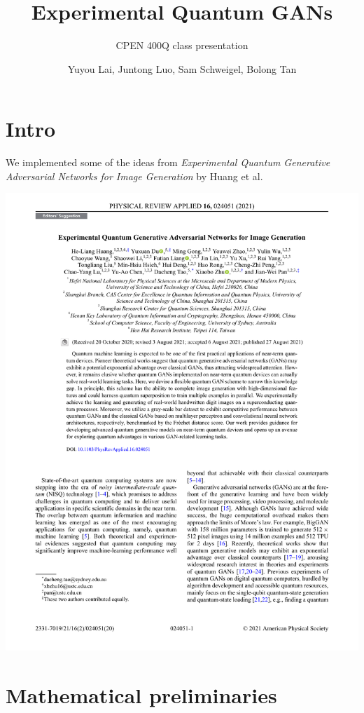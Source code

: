 \documentclass{beamer}
\title{Experimental Quantum GANs}
\subtitle{CPEN 400Q class presentation}
\author{Yuyou Lai, Juntong Luo, Sam Schweigel, Bolong Tan}
\date{}
\begin{document}
\frame{\titlepage}

\section{Intro}

\begin{frame}
  We implemented some of the ideas from \emph{Experimental Quantum Generative
  Adversarial Networks for Image Generation}\autocite{huang2021} by Huang et al.

  \begin{center}
    \vfill
    \includegraphics[width=0.8\linewidth,clip,frame,trim=0 500 0 0]{figures/paper-preview.pdf}%
    \\[-4em]%
  \end{center}
\end{frame}

\section{Mathematical preliminaries}
\end{document}
